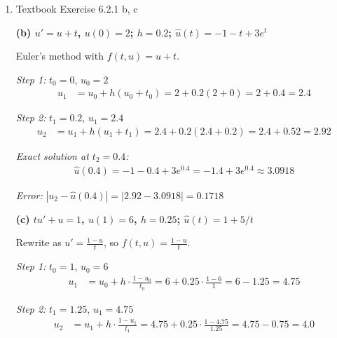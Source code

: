 \documentclass[reqno, answers]{exam}
\begin{document}
\begin{enumerate}
\begin{solution}
          \textbf{Conclusion:} No, the solution does NOT necessarily exist for all $t \in [0,1]$. It exists on $[0,1]$ if and only if $\alpha < 1$.

        \end{solution}
  \item Textbook Exercise 6.2.1 b, c
        \begin{solution}

          \textbf{(b) $u' = u + t$, $u(0) = 2$; $h = 0.2$; $\hat{u}(t) = -1 - t + 3e^t$}

          Euler's method with $f(t,u) = u + t$.

          \textit{Step 1:} $t_0 = 0$, $u_0 = 2$
          \begin{align*}
            u_1 & = u_0 + h(u_0 + t_0) = 2 + 0.2(2 + 0) = 2 + 0.4 = 2.4
          \end{align*}

          \textit{Step 2:} $t_1 = 0.2$, $u_1 = 2.4$
          \begin{align*}
            u_2 & = u_1 + h(u_1 + t_1) = 2.4 + 0.2(2.4 + 0.2) = 2.4 + 0.52 = 2.92
          \end{align*}

          \textit{Exact solution at $t_2 = 0.4$:}
          \begin{align*}
            \hat{u}(0.4) = -1 - 0.4 + 3e^{0.4} = -1.4 + 3e^{0.4} \approx 3.0918
          \end{align*}

          \textit{Error:} $|u_2 - \hat{u}(0.4)| = |2.92 - 3.0918| = 0.1718$

          \medskip

          \textbf{(c) $tu' + u = 1$, $u(1) = 6$, $h = 0.25$; $\hat{u}(t) = 1 + 5/t$}

          Rewrite as $u' = \frac{1-u}{t}$, so $f(t,u) = \frac{1-u}{t}$.

          \textit{Step 1:} $t_0 = 1$, $u_0 = 6$
          \begin{align*}
            u_1 & = u_0 + h \cdot \frac{1-u_0}{t_0} = 6 + 0.25 \cdot \frac{1-6}{1} = 6 - 1.25 = 4.75
          \end{align*}

          \textit{Step 2:} $t_1 = 1.25$, $u_1 = 4.75$
          \begin{align*}
            u_2 & = u_1 + h \cdot \frac{1-u_1}{t_1} = 4.75 + 0.25 \cdot \frac{1-4.75}{1.25} = 4.75 - 0.75 = 4.0
          \end{align*}


\end{solution}
\end{enumerate}
\end{document}
